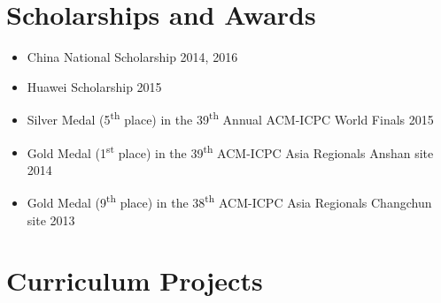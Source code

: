 \documentclass[11pt,letterpaper,sans]{moderncv}        %
\begin{document}
\section{Scholarships and Awards}

\begin{itemize}
\item China National Scholarship \hfill 2014, 2016
\item Huawei Scholarship \hfill 2015
	\item Silver Medal (5\textsuperscript{th} place) in the 39\textsuperscript{th} Annual ACM-ICPC World Finals \hfill 2015
	\item Gold Medal (1\textsuperscript{st} place) in the 39\textsuperscript{th} ACM-ICPC Asia Regionals Anshan site \hfill 2014
	\item Gold Medal (9\textsuperscript{th} place) in the 38\textsuperscript{th} ACM-ICPC Asia Regionals Changchun site \hfill 2013
\end{itemize}

\section{Curriculum Projects}
\end{document}
